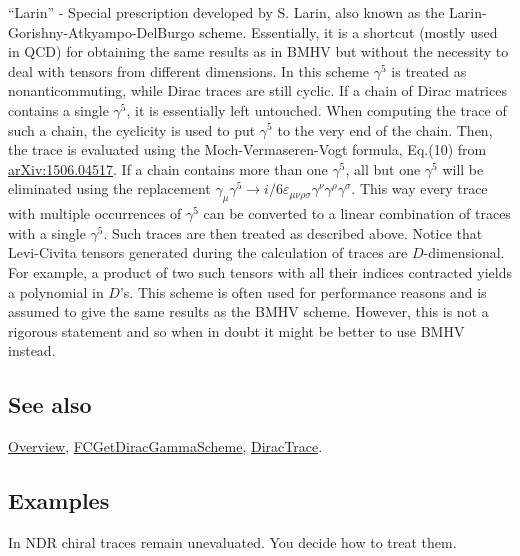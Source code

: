\documentclass[../FeynCalcManual.tex]{subfiles}
\begin{document}
``Larin'' - Special prescription developed by S. Larin, also known as
the Larin-Gorishny-Atkyampo-DelBurgo scheme. Essentially, it is a
shortcut (mostly used in QCD) for obtaining the same results as in BMHV
but without the necessity to deal with tensors from different
dimensions. In this scheme \(\gamma^5\) is treated as nonanticommuting,
while Dirac traces are still cyclic. If a chain of Dirac matrices
contains a single \(\gamma^5\), it is essentially left untouched. When
computing the trace of such a chain, the cyclicity is used to put
\(\gamma^5\) to the very end of the chain. Then, the trace is evaluated
using the Moch-Vermaseren-Vogt formula, Eq.(10) from
\href{https://arxiv.org/pdf/1506.04517.pdf}{arXiv:1506.04517}. If a
chain contains more than one \(\gamma^5\), all but one \(\gamma^5\) will
be eliminated using the replacement
\(\gamma_\mu \gamma^5 \to i/6 \varepsilon_{\mu \nu \rho \sigma} \gamma^\nu \gamma^\rho \gamma^\sigma\).
This way every trace with multiple occurrences of \(\gamma^5\) can be
converted to a linear combination of traces with a single \(\gamma^5\).
Such traces are then treated as described above. Notice that Levi-Civita
tensors generated during the calculation of traces are
\(D\)-dimensional. For example, a product of two such tensors with all
their indices contracted yields a polynomial in \(D\)'s. This scheme is
often used for performance reasons and is assumed to give the same
results as the BMHV scheme. However, this is not a rigorous statement
and so when in doubt it might be better to use BMHV instead.

\subsection{See also}

\hyperlink{toc}{Overview},
\hyperlink{fcgetdiracgammascheme}{FCGetDiracGammaScheme},
\hyperlink{diractrace}{DiracTrace}.

\subsection{Examples}

In NDR chiral traces remain unevaluated. You decide how to treat them.
\end{document}
